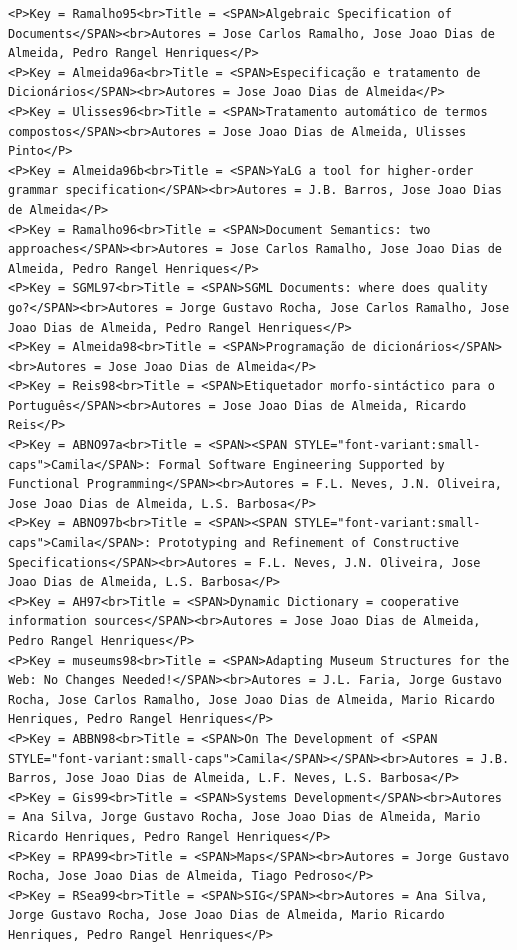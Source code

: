 \documentclass[11pt,a4paper]{report}
\begin{document}
\begin{appendices}
\begin{lstlisting}
<P>Key = Ramalho95<br>Title = <SPAN>Algebraic Specification of Documents</SPAN><br>Autores = Jose Carlos Ramalho, Jose Joao Dias de Almeida, Pedro Rangel Henriques</P>
<P>Key = Almeida96a<br>Title = <SPAN>Especificação e tratamento de Dicionários</SPAN><br>Autores = Jose Joao Dias de Almeida</P>
<P>Key = Ulisses96<br>Title = <SPAN>Tratamento automático de termos compostos</SPAN><br>Autores = Jose Joao Dias de Almeida, Ulisses Pinto</P>
<P>Key = Almeida96b<br>Title = <SPAN>YaLG a tool for higher-order grammar specification</SPAN><br>Autores = J.B. Barros, Jose Joao Dias de Almeida</P>
<P>Key = Ramalho96<br>Title = <SPAN>Document Semantics: two approaches</SPAN><br>Autores = Jose Carlos Ramalho, Jose Joao Dias de Almeida, Pedro Rangel Henriques</P>
<P>Key = SGML97<br>Title = <SPAN>SGML Documents: where does quality go?</SPAN><br>Autores = Jorge Gustavo Rocha, Jose Carlos Ramalho, Jose Joao Dias de Almeida, Pedro Rangel Henriques</P>
<P>Key = Almeida98<br>Title = <SPAN>Programação de dicionários</SPAN><br>Autores = Jose Joao Dias de Almeida</P>
<P>Key = Reis98<br>Title = <SPAN>Etiquetador morfo-sintáctico para o Português</SPAN><br>Autores = Jose Joao Dias de Almeida, Ricardo Reis</P>
<P>Key = ABNO97a<br>Title = <SPAN><SPAN STYLE="font-variant:small-caps">Camila</SPAN>: Formal Software Engineering Supported by Functional Programming</SPAN><br>Autores = F.L. Neves, J.N. Oliveira, Jose Joao Dias de Almeida, L.S. Barbosa</P>
<P>Key = ABNO97b<br>Title = <SPAN><SPAN STYLE="font-variant:small-caps">Camila</SPAN>: Prototyping and Refinement of Constructive Specifications</SPAN><br>Autores = F.L. Neves, J.N. Oliveira, Jose Joao Dias de Almeida, L.S. Barbosa</P>
<P>Key = AH97<br>Title = <SPAN>Dynamic Dictionary = cooperative information sources</SPAN><br>Autores = Jose Joao Dias de Almeida, Pedro Rangel Henriques</P>
<P>Key = museums98<br>Title = <SPAN>Adapting Museum Structures for the Web: No Changes Needed!</SPAN><br>Autores = J.L. Faria, Jorge Gustavo Rocha, Jose Carlos Ramalho, Jose Joao Dias de Almeida, Mario Ricardo Henriques, Pedro Rangel Henriques</P>
<P>Key = ABBN98<br>Title = <SPAN>On The Development of <SPAN STYLE="font-variant:small-caps">Camila</SPAN></SPAN><br>Autores = J.B. Barros, Jose Joao Dias de Almeida, L.F. Neves, L.S. Barbosa</P>
<P>Key = Gis99<br>Title = <SPAN>Systems Development</SPAN><br>Autores = Ana Silva, Jorge Gustavo Rocha, Jose Joao Dias de Almeida, Mario Ricardo Henriques, Pedro Rangel Henriques</P>
<P>Key = RPA99<br>Title = <SPAN>Maps</SPAN><br>Autores = Jorge Gustavo Rocha, Jose Joao Dias de Almeida, Tiago Pedroso</P>
<P>Key = RSea99<br>Title = <SPAN>SIG</SPAN><br>Autores = Ana Silva, Jorge Gustavo Rocha, Jose Joao Dias de Almeida, Mario Ricardo Henriques, Pedro Rangel Henriques</P>

\end{lstlisting}
\end{appendices}
\end{document}
